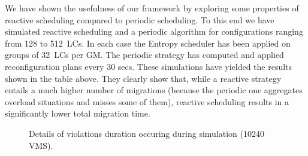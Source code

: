 
We have shown the usefulness of our framework by exploring some
properties of reactive scheduling compared to periodic scheduling. To
this end we have simulated reactive scheduling and a periodic
algorithm for configurations ranging from 128 to 512~LCs. In each case
the Entropy scheduler has been applied on groups of 32~LCs per GM. The
periodic strategy has computed and applied reconfiguration plans every
30 secs. These simulations have yielded the results shown in the table
above. They clearly show that, while a reactive strategy entails a
much higher number of migrations (because the periodic one aggregates
overload situations and misses some of them), reactive scheduling
results in a significantly lower total migration time. 

\begin{figure}
\subcapcentertrue
{}
\caption{Details of violations duration occuring during simulation (10240 VMS).}
\label{fig:violation_clouds}
\end{figure}

